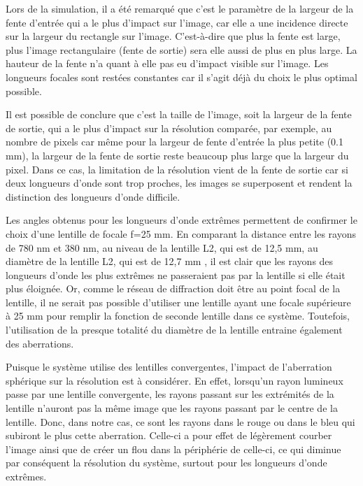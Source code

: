 \documentclass[conference]{IEEEtran}
\begin{document}
Lors de la simulation, il a été remarqué que c'est le paramètre de la largeur de la fente d'entrée qui a le plus d'impact sur l'image,
car elle a une incidence directe sur la largeur du rectangle sur l'image. C'est-à-dire que plus la fente est large, plus
l'image rectangulaire (fente de sortie) sera elle aussi de plus en plus large. La hauteur de la fente n'a quant à elle pas eu d'impact
visible sur l'image. Les longueurs focales sont restées constantes car il s'agit déjà du choix le plus optimal possible.

Il est possible de conclure que c'est la taille de l'image, soit la largeur de la fente de sortie, qui a le plus d'impact sur la résolution comparée, par exemple, au nombre de pixels
car même pour la largeur de fente d'entrée la plus petite (0.1 mm), la largeur de la fente de sortie reste beaucoup plus large que la largeur du pixel.
Dans ce cas, la limitation de la résolution vient de la fente de sortie car si deux longueurs d'onde sont trop proches, les images se superposent
et rendent la distinction des longueurs d'onde difficile.

Les angles obtenus pour les longueurs d'onde extrêmes permettent de confirmer le choix d'une lentille de focale f=25 mm. En 
comparant la distance entre les rayons de 780 nm et 380 nm, au niveau de la lentille L2, qui est de 12,5 mm, au diamètre de
la lentille L2, qui est de 12,7 mm \cite{thorlabs_diffraction_gratings}, il est clair que les rayons des longueurs d'onde 
les plus extrêmes ne passeraient pas par la lentille si elle était plus éloignée. Or, comme le réseau de diffraction doit être
au point focal de la lentille, il ne serait pas possible d'utiliser une lentille ayant une focale supérieure à 25 mm pour 
remplir la fonction de seconde lentille dans ce système. Toutefois, l'utilisation de la presque totalité du diamètre de la 
lentille entraine également des aberrations.

Puisque le système utilise des lentilles convergentes, l'impact de l'aberration sphérique \cite{edmund_optics_aberrations} sur la résolution est à considérer.
En effet, lorsqu'un rayon lumineux passe par une lentille convergente, les rayons passant sur les extrémités de la lentille
n'auront pas la même image que les rayons passant par le centre de la lentille. Donc, dans notre cas, ce sont les
rayons dans le rouge ou dans le bleu qui subiront le plus cette aberration. Celle-ci a pour effet de légèrement courber l'image
ainsi que de créer un flou dans la périphérie de celle-ci, ce qui diminue par conséquent la résolution du système, surtout pour les longueurs d'onde
extrêmes. 
\end{document}
